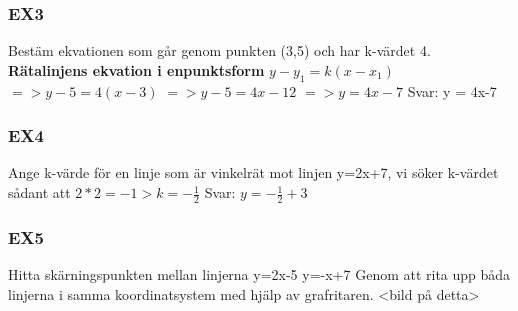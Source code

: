 \documentclass[a4paper,10pt]{article}
\begin{document}
\begin{flushleft}
\subsubsection{EX3}
Bestäm ekvationen som går genom punkten (3,5) och har k-värdet 4.\newline
\textbf{Rätalinjens ekvation i enpunktsform}\newline
$y - y_1 = k(x-x_1)$ \newline
$=> y-5 = 4(x-3)$ \newline
$=> y-5 = 4x-12 $ \newline
$=> y=4x-7$
Svar: y = 4x-7

\subsubsection{EX4}
Ange k-värde för en linje som är vinkelrät mot linjen y=2x+7, vi söker k-värdet sådant att $2*2=-1 > k = -\frac{1}{2}$ \newline
Svar: $y = -\frac{1}{2} + 3$

\subsubsection{EX5}
Hitta skärningspunkten mellan linjerna
y=2x-5\newline
y=-x+7\newline
Genom att rita upp båda linjerna i samma koordinatsystem med hjälp av grafritaren. \newline
<bild på detta>\newline



\end{flushleft}
\end{document}
